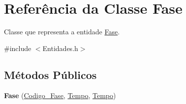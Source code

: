\hypertarget{class_fase}{
\section{\-Referência da \-Classe \-Fase}
\label{class_fase}
}


\-Classe que representa a entidade \hyperlink{class_fase}{\-Fase}.  




{\ttfamily \#include $<$\-Entidades.\-h$>$}

\subsection*{\-Métodos \-Públicos}
\begin{DoxyCompactItemize}
\item 
\hypertarget{class_fase_a01205110dcfe61f938e5cbbda81f458f}{
{\bfseries \-Fase} (\hyperlink{class_codigo___fase}{\-Codigo\-\_\-\-Fase}, \hyperlink{class_tempo}{\-Tempo}, \hyperlink{class_tempo}{\-Tempo})}
\label{class_fase_a01205110dcfe61f938e5cbbda81f458f}


\end{DoxyCompactItemize}
